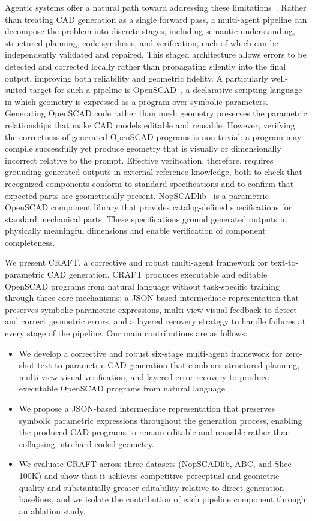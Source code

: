 \documentclass[conference]{IEEEtran}
\begin{document}
Agentic systems offer a natural path toward addressing these limitations~\citep{guo2024multiagent,madaan2023selfrefine}. Rather than treating CAD generation as a single forward pass, a multi-agent pipeline can decompose the problem into discrete stages, including semantic understanding, structured planning, code synthesis, and verification, each of which can be independently validated and repaired. This staged architecture allows errors to be detected and corrected locally rather than propagating silently into the final output, improving both reliability and geometric fidelity. A particularly well-suited target for such a pipeline is OpenSCAD~\citep{openscad}, a declarative scripting language in which geometry is expressed as a program over symbolic parameters. Generating OpenSCAD code rather than mesh geometry preserves the parametric relationships that make CAD models editable and reusable. However, verifying the correctness of generated OpenSCAD programs is non-trivial: a program may compile successfully yet produce geometry that is visually or dimensionally incorrect relative to the prompt. Effective verification, therefore, requires grounding generated outputs in external reference knowledge, both to check that recognized components conform to standard specifications and to confirm that expected parts are geometrically present. NopSCADlib~\citep{nopscadlib} is a parametric OpenSCAD component library that provides catalog-defined specifications for standard mechanical parts. These specifications ground generated outputs in physically meaningful dimensions and enable verification of component completeness.

We present CRAFT, a corrective and robust multi-agent framework for text-to-parametric CAD generation. CRAFT produces executable and editable OpenSCAD programs from natural language without task-specific training through three core mechanisms: a JSON-based intermediate representation that preserves symbolic parametric expressions, multi-view visual feedback to detect and correct geometric errors, and a layered recovery strategy to handle failures at every stage of the pipeline. Our main contributions are as follows:
\begin{itemize}[topsep=0pt]
\item We develop a corrective and robust six-stage multi-agent framework for zero-shot text-to-parametric CAD generation that combines structured planning, multi-view visual verification, and layered error recovery to produce executable OpenSCAD programs from natural language.
\item We propose a JSON-based intermediate representation that preserves symbolic parametric expressions throughout the generation process, enabling the produced CAD programs to remain editable and reusable rather than collapsing into hard-coded geometry.
\item We evaluate CRAFT across three datasets (NopSCADlib, ABC, and Slice-100K) and show that it achieves competitive perceptual and geometric quality and substantially greater editability relative to direct generation baselines, and we isolate the contribution of each pipeline component through an ablation study.
\end{itemize}
\end{document}
